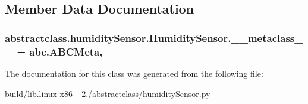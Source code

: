 \subsection{Member Data Documentation}
\hypertarget{classabstractclass_1_1humiditySensor_1_1HumiditySensor_ae891c9ab07bd8e2c52d00b394f0f4041}{}
\subsubsection[{\+\_\+\+\_\+metaclass\+\_\+\+\_\+}]{\setlength{\rightskip}{0pt plus 5cm}abstractclass.\+humidity\+Sensor.\+Humidity\+Sensor.\+\_\+\+\_\+metaclass\+\_\+\+\_\+ = abc.\+A\+B\+C\+Meta\hspace{0.3cm}{\ttfamily [static]}, {\ttfamily [private]}}\label{classabstractclass_1_1humiditySensor_1_1HumiditySensor_ae891c9ab07bd8e2c52d00b394f0f4041}


The documentation for this class was generated from the following file\+:\begin{DoxyCompactItemize}
\item 
build/lib.\+linux-\/x86\+\_-\/2./abstractclass/\hyperlink{build_2lib_8linux-x86__64-2_87_2abstractclass_2humiditySensor_8py}{humidity\+Sensor.\+py}\end{DoxyCompactItemize}
